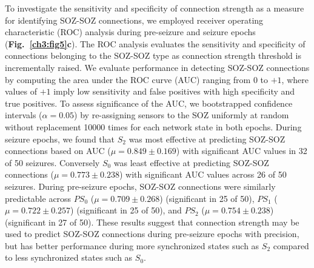 To investigate the sensitivity and specificity of connection strength as a measure for identifying SOZ-SOZ connections, we employed receiver operating characteristic (ROC) analysis during pre-seizure and seizure epochs (\textbf{Fig.~\ref{ch3:fig5}c}). The ROC analysis evaluates the sensitivity and specificity of connections belonging to the SOZ-SOZ type as connection strength threshold is incrementally raised. We evaluate performance in detecting SOZ-SOZ connections by computing the area under the ROC curve (AUC) ranging from $0$ to $+1$, where values of $+1$ imply low sensitivity and false positives with high specificity and true positives. To assess significance of the AUC, we bootstrapped confidence intervals ($\alpha=0.05$) by re-assigning sensors to the SOZ uniformly at random without replacement 10000 times for each network state in both epochs. During seizure epochs, we found that $S_2$ was most effective at predicting SOZ-SOZ connections based on AUC ($\mu=0.849\pm0.169$) with significant AUC values in 32 of 50 seizures. Conversely $S_0$ was least effective at predicting SOZ-SOZ connections ($\mu=0.773\pm0.238$) with significant AUC values across 26 of 50 seizures. During pre-seizure epochs, SOZ-SOZ connections were similarly predictable across $PS_0$ ($\mu=0.709\pm0.268$) (significant in 25 of 50), $PS_1$ ($\mu=0.722\pm0.257$) (significant in 25 of 50), and $PS_2$ ($\mu=0.754\pm0.238$) (significant in 27 of 50). These results suggest that connection strength may be used to predict SOZ-SOZ connections during pre-seizure epochs with precision, but has better performance during more synchronized states such as $S_2$ compared to less synchronized states such as $S_0$.

